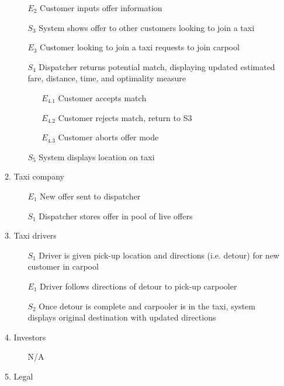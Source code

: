 \documentclass[]{article}
\begin{document}
\begin{enumerate}[{\textbf{BE}}1.]
\begin{enumerate}[{\textbf{VP5}}.1]
\begin{enumerate}
                \item[$E_2$] Customer inputs offer information
                \item[$S_3$] System shows offer to other customers looking to join a taxi
                \item[$E_3$] Customer looking to join a taxi requests to join carpool
                \item[$S_4$] Dispatcher returns potential match, displaying updated estimated fare, distance, time, and optimality measure
                \begin{enumerate}
                    \item[$E_{4.1}$] Customer accepts match
                    \item[$E_{4.2}$] Customer rejects match, return to S3
                    \item[$E_{4.3}$] Customer aborts offer mode
                \end{enumerate}
		\item[$S_5$] System displays location on taxi
            \end{enumerate}
        \item Taxi company
            \begin{enumerate}
                \item[$E_1$] New offer sent to dispatcher
                \item[$S_1$] Dispatcher stores offer in pool of live offers
            \end{enumerate}
        \item Taxi drivers
            \begin{enumerate}
                \item[$S_1$] Driver is given pick-up location and directions (i.e. detour) for new customer in carpool
                \item[$E_1$] Driver follows directions of detour to pick-up carpooler
                \item[$S_2$] Once detour is complete and carpooler is in the taxi, system displays original destination with updated directions
            \end{enumerate}
        \item Investors
            \begin{enumerate}
                \item[N/A]
            \end{enumerate}
        \item Legal
            \begin{enumerate}

\end{enumerate}
\end{enumerate}
\end{enumerate}
\end{document}
